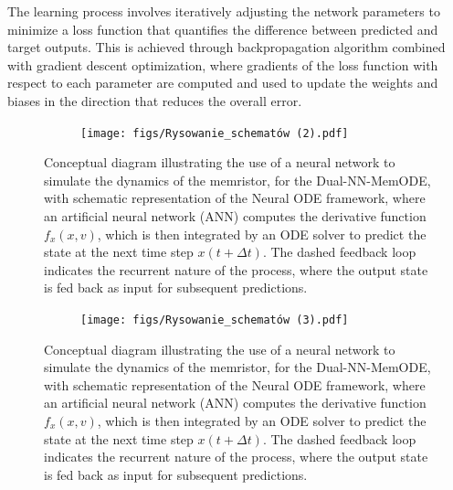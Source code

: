 \documentclass[11pt, oneside]{article}
\begin{document}
The learning process involves iteratively adjusting the network parameters to minimize a loss function that quantifies the difference between predicted and target outputs. This is  achieved through backpropagation algorithm combined with gradient descent optimization, where gradients of the loss function with respect to each parameter are computed and used to update the weights and biases in the direction that reduces the overall error.

\begin{figure}[ht]
    \centering
    \begin{subfigure}[b]{0.8\textwidth}
        \texttt{[image: figs/Rysowanie\_schematów (2).pdf]}
        \caption{}
    \end{subfigure}

    \caption{ Conceptual diagram illustrating the use of a neural network to simulate the dynamics of the memristor, for the Dual-NN-MemODE, with schematic representation of the Neural ODE framework, where an artificial neural network (ANN) computes the derivative function \(f_x(x,v)\), which is then integrated by an ODE solver to predict the state at the next time step \(x(t + \Delta t)\). The dashed feedback loop indicates the recurrent nature of the process, where the output state is fed back as input for subsequent predictions.}
    \label{fig:nn_structure}
\end{figure}

\begin{figure}[ht!]
    \centering
    \begin{subfigure}[b]{0.8\textwidth}
        \texttt{[image: figs/Rysowanie\_schematów (3).pdf]}
        \caption{}
    \end{subfigure}

    \caption{ Conceptual diagram illustrating the use of a neural network to simulate the dynamics of the memristor, for the Dual-NN-MemODE, with schematic representation of the Neural ODE framework, where an artificial neural network (ANN) computes the derivative function \(f_x(x,v)\), which is then integrated by an ODE solver to predict the state at the next time step \(x(t + \Delta t)\). The dashed feedback loop indicates the recurrent nature of the process, where the output state is fed back as input for subsequent predictions.}
    \label{fig:nn_structure_dual}
\end{figure}
\end{document}
